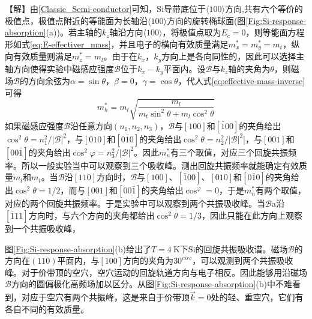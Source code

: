 【解】由\ref{Classic_Semi-conductor}可知，Si导带底位于$\langle100\rangle$方向,共有六个等价的极值点，极值点附近的等能面为长轴沿$\langle100\rangle$方向的旋转椭球面(图\ref{Fig:Si-response-absorption}(a))。若主轴的$k_z$轴沿方向$\langle100\rangle$，将极值点取为$E_c=0$，则等能面方程形如式\eqref{eq:E-effectiver_mass}，并且电子的横向有效质量满足$m_x^{\ast}=m_y^{\ast}=m_t$，纵向有效质量则满足$m_z^{\ast}=m_l$。由于在$k_x$，$k_y$方向上是各向同性的，因此可以选择主轴方向使得实验中磁感应强度$\mathscr{B}$位于$k_x-k_y$平面内。设$\mathscr{B}$与$k_z$轴的夹角为$\theta$，则磁场$\mathscr{B}$的方向余弦为$\alpha=\sin\theta$，$\beta=0$，$\gamma=\cos\theta$，代人式\eqref{eq:effective-mass-inverse}可得
\begin{displaymath}
	m_h^{\ast}=m_t\sqrt{\dfrac{m_l}{m_t\sin^2\theta+m_l\cos^2\theta}}
\end{displaymath} 
如果磁感应强度$\mathscr{B}$沿任意方向$(n_1,n_2,n_3)$，$\mathscr{B}$与$[100]$和$[\bar{1}00]$的夹角给出$\cos^2\theta=n_1^2/|\mathscr{B}|^2$，与$[010]$和$[0\bar{1}0]$的夹角给出$\cos^2\theta=n_2^2/|\mathscr{B}|^2$|，与$[001]$和$[00\bar{1}]$的夹角给出$\cos^2\varphi=n_3^2/|\mathscr{B}|^2$。因此$m_n^{\ast}$有三个取值，对应三个回旋共振频率。所以一般实验当中可以观察到三个吸收峰。测出回旋共振频率就能确定有效质量$m_l$和$m_t$。当$\mathscr{B}$沿$[110]$方向时，$\mathscr{B}$与$[100]$、$[\bar{1}00]$、$[010]$和$[0\bar{1}0]$的夹角给出$\cos^2\theta=1/2$，而与$[001]$和$[00\bar{1}]$的夹角给出$\cos^\varphi=0$，于是$m_n^{\ast}$有两个取值，对应的两个回旋共振频率。于是实验中可以观察到两个共振吸收峰。当$\mathscr{B}$a沿$[\bar{1}11]$方向时，与六个方向的夹角都给出$\cos^2\theta=1/3$，因此只能在此方向上观察到一个共振吸收峰，

图\ref{Fig:Si-response-absorption}(b)给出了$T=4~\mathrm{K}$下Si的回旋共振吸收谱。磁场$\mathscr{B}$的方向在$(110)$平面内，与$[100]$方向的夹角为$30^{circ}$，可以观测到两个共振吸收峰。对于价带顶的空穴，空穴运动的回旋轨道方向与电子相反。因此能够用沿磁场$\mathscr{B}$方向的圆偏极化高频场加以区分。从图\ref{Fig:Si-response-absorption}(b)中不难看到，对应于空穴有两个共振峰，这是来自于价带顶$\vec k=0$处的轻、重空穴，它们有各自不同的有效质量。

